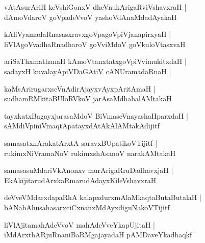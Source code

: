 \documentclass[twoside,12pt,openright]{book}
\newcounter{shloka}[chapter]
\begin{document}
\begin{shloka}%
vAtAsurAriH keVshiGonxV dheVnukArigaRviVshavxraH |\\
dAmoVdaroV goVpadeVvoV yashoVdAnaMdadAyakaH 
\end{shloka}

\begin{shloka}%
kAliVyamadaRnasasxravxgoVpagoVpiVjanapirxyaH |\\
liVlAgoVvadhaRnadharoV goVviMdoV goVkuloVtasxvaH 
\end{shloka}

\begin{shloka}%
ariSaThxmathanaH kAmoVtanxtatxgoVpiVvimukitxdaH |\\
sadayxH kuvalayApiVDaGAtiV cANUramadaRnaH |\\
\end{shloka}

\begin{shloka}%
kaMsArirugarxseVnAdirAjayxvAyxpAritAmaH |\\
sudhamRMkitaBUloRVkoV jarAsaMdhabalAMtakaH 
\end{shloka}

\begin{shloka}%
tayxkatxBagayxjarasaMdoV BiVmaseVnayashaHparxdaH |\\
sAMdiVpiniVmaqtApatayxdAtAkAlAMtakAdijitf
\end{shloka}

\begin{shloka}%
samasatxnArakatArxtA saravxBUpatikoVTijitf |\\
rukimxNiVramaNoV rukimxshAsanoV narakAMtakaH 
\end{shloka}

\begin{shloka}%
samasasuMdariVkAnonxv murArigaRruDadhavxjaH |\\
EkAkijitarudArxkaRmarudAdayxKileVshavxraH
\end{shloka}

\begin{shloka}%
deVveVMdarxdapaRhA kalapxdurxmAlaMkaqtaButaButalaH |\\
bANabAhusahasarxciCxnanxMdAyxdiguNakoVTijitf
\end{shloka}

\begin{shloka}%
liVlAjitamahAdeVvoV mahAdeVveYkapUjitaH |\\
iMdArxthARjuRnaniBaRMgajayadaH pAMDaveYkadhaqkf 
\end{shloka}
\end{document}
